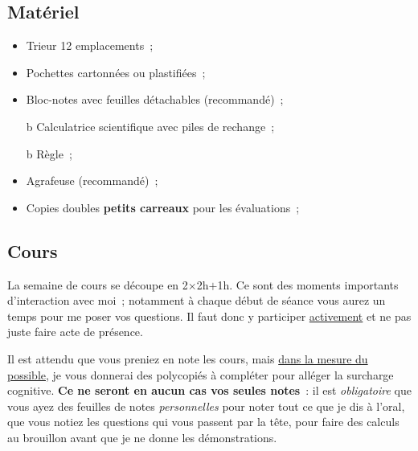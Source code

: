 \documentclass[a4paper, 10pt, garamond]{book}
\begin{document}
\subsection{Matériel}
\noindent
\begin{minipage}[t]{.48\linewidth}
	\begin{itemize}
		\item Trieur 12 emplacements~;
		\item Pochettes cartonnées ou plastifiées~;
		\item Bloc-notes avec feuilles détachables (recommandé)~;
		      \item[b]{Calculatrice scientifique} avec piles de rechange~;
	\end{itemize}
\end{minipage}
\hfill
\begin{minipage}[t]{.48\linewidth}
	\begin{itemize}
		\item[b]{Règle}~;
		\item Agrafeuse (recommandé)~;
		\item Copies doubles \textbf{petits carreaux} pour les évaluations~;
	\end{itemize}
\end{minipage}

\subsection{Cours}
La semaine de cours se découpe en 2$\times$2h$+$1h. Ce sont des moments
importants d'interaction avec moi~; notamment à chaque début de séance vous
aurez un temps pour me poser vos questions. Il faut donc y participer
\ul{activement} et ne pas juste faire acte de présence.

Il est attendu que vous preniez en note les cours, mais \ul{dans la mesure du
	possible}, je vous donnerai des polycopiés à compléter pour alléger la surcharge
cognitive. \textbf{Ce ne seront en aucun cas vos seules notes}~: il est
\textit{obligatoire} que vous ayez des feuilles de notes \textit{personnelles}
pour noter tout ce que je dis à l'oral, que vous notiez les questions qui vous
passent par la tête, pour faire des calculs au brouillon avant que je ne donne
les démonstrations.


\end{document}
